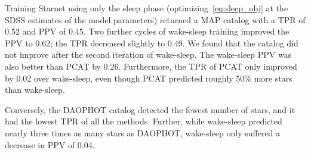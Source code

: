 Training Starnet using only the sleep phase (optimizing~\eqref{eq:sleep_obj} at the SDSS estimates of the model parameters) returned 
a MAP catalog with a TPR of 0.52 and PPV of 0.45. Two further cycles of wake-sleep training improved the PPV to 0.62; the TPR decreased slightly to 0.49. We found that the catalog did not improve after the second iteration of wake-sleep. The wake-sleep PPV was also better than PCAT by 0.26. Furthermore, the TPR of PCAT
only improved by 0.02 over wake-sleep, even though PCAT predicted roughly 50\% more stars than wake-sleep. 





Conversely, the DAOPHOT catalog detected the fewest number of stars, and it had the lowest TPR of all the methods.
Further, while wake-sleep predicted nearly three times as many stars as DAOPHOT, wake-sleep only suffered a decrease in PPV of 0.04. 




